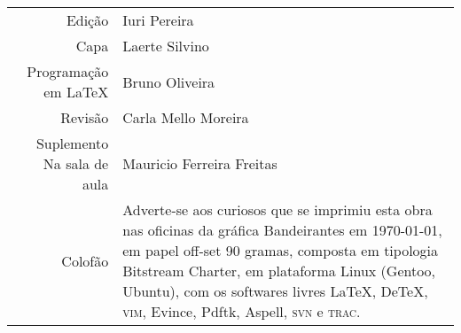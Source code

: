 
\newcommand{\putline}[2]{#1 & #2\\}

%
\ifodd\thepage\paginabranca\else\clearpage\fi
\pagebreak
\thispagestyle{empty}

\noindent\begin{tabular}{rp{}}\small
    \putline{Edição}{Iuri Pereira}
		\putline{Capa}{Laerte Silvino}
		\putline{Programação em \LaTeX}{Bruno Oliveira}
		\putline{Revisão}{Carla Mello Moreira}
		\putline{Suplemento Na sala de aula}{Mauricio Ferreira Freitas}
		\putline{Colofão}{Adverte-se aos curiosos que se
			imprimiu esta obra nas oficinas da gráfica
			Bandeirantes em \today, em papel 
			\mbox{off-set} 90 gramas,
			composta em tipologia Bitstream Charter, 
			em plataforma Linux (Gentoo, Ubuntu), 
			com os softwares livres 
			\LaTeX, De\TeX, \textsc{vim}, Evince, Pdftk, 
			Aspell, \textsc{svn} e \textsc{trac}.}
\end{tabular}

